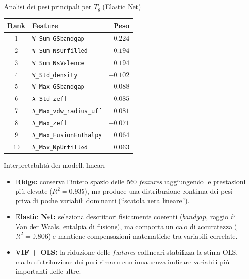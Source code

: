 \documentclass[10pt, aspectratio=169, table]{beamer}
\begin{document}
	\begin{frame}{Analisi dei pesi principali per $T_g$ (Elastic Net)}
		\centering
		\footnotesize
		\renewcommand{\arraystretch}{1.2}
		\begin{tabular}{cl r}
			\toprule
			\textbf{Rank} & \textbf{Feature} & \textbf{Peso} \\
			\midrule
			1 & \texttt{W\_Sum\_GSbandgap} & $-0.224$ \\
			\rowcolor{HighlightBg} 2 & \texttt{W\_Sum\_NsUnfilled} & $-0.194$ \\
			\rowcolor{HighlightBg} 3 & \texttt{W\_Sum\_NsValence} & $0.194$ \\
			4 & \texttt{W\_Std\_density} & $-0.102$ \\
			5 & \texttt{W\_Max\_GSbandgap} & $-0.088$ \\
			6 & \texttt{A\_Std\_zeff} & $-0.085$ \\
			7 & \texttt{A\_Max\_vdw\_radius\_uff} & $0.081$ \\
			8 & \texttt{A\_Max\_zeff} & $-0.071$ \\
			9 & \texttt{A\_Max\_FusionEnthalpy} & $0.064$ \\
			10 & \texttt{A\_Max\_NpUnfilled} & $0.063$ \\
			\bottomrule
		\end{tabular}
	\end{frame}
	
	\begin{frame}{Interpretabilità dei modelli lineari}
		\small
		\begin{itemize}
			
			\item \textbf{Ridge:} conserva l'intero spazio delle 560 \textit{features} raggiungendo le prestazioni più elevate ($R^2 = 0.935$), ma produce una distribuzione continua dei pesi priva di poche variabili dominanti (``scatola nera lineare'').
			\vspace{0.35cm}
			
			\item \textbf{Elastic Net:} seleziona descrittori fisicamente coerenti (\textit{bandgap}, raggio di Van der Waals, entalpia di fusione), ma comporta un calo di accuratezza ($R^2 = 0.806$) e mantiene compensazioni matematiche tra variabili correlate.
			\vspace{0.35cm}
						
			\item \textbf{VIF + OLS:} la riduzione delle \textit{features} collineari stabilizza la stima OLS, ma la distribuzione dei pesi rimane continua senza indicare variabili più importanti delle altre.
			
		\end{itemize}
	\end{frame}
	
\end{document}
